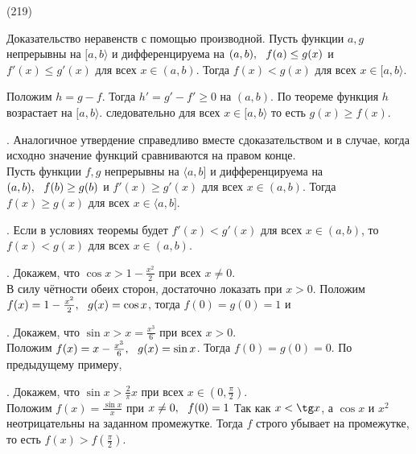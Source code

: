 (219)

\T \q Доказательство неравенств с помощью производной. Пусть функции $a, g$ непрерывны на $[a, b\rangle$ и дифференцируема на $(a, b),\ \  f(a) \le g(x)$ и $f'(x) \le g'(x)$ для всех $x \in (a, b)$. Тогда $f(x) < g(x)$ для всех $x \in [a, b\rangle$.

\D Положим $h = g - f$. Тогда $h' = g' - f' \ge 0$ на $(a, b)$. По теореме функция $h$ возрастает на $[a, b\rangle$. следовательно для всех $x \in [a, b\rangle$  то есть $g(x) \ge f(x)$.

. Аналогичное утвердение справедливо вместе сдоказательством и в случае, когда исходно значение функций сравниваются на правом конце.\\
Пусть функции $f, g$ непрерывны на $\langle a, b]$  и дифференцируема на $(a, b),\ \  f(b) \ge g(b)$ и $f'(x) \ge g'(x)$ для всех $x \in  (a, b)$. Тогда $f(x) \ge g(x)$ для всех $x \in \langle a, b]$.

. Если в условиях теоремы будет $f'(x) < g'(x)$ для всех $x \in (a, b)$, то $f(x) < g(x)$ для всех $x \in (a, b)$.

. Докажем, что $\cos x > 1 - \frac{x^2}2$ при всех $x\neq 0$.\\
В силу чётности обеих сторон, достаточно локазать при $x > 0$. Положим $f(x) = 1 - \frac{x^2}2,\ \  g(x) = \cos x$, тогда $f(0) = g(0) = 1$ и 

. Докажем, что $\sin x > x = \frac{x^3}6$ при всех $x > 0$.\\
Положим $f(x) = x - \frac{x^3}6,\ \  g(x) = \sin x$. Тогда $f(0) = g(0) = 0$. По предыдущему примеру, 

. Докажем, что $\sin x > \frac 2\pi x$ при всех $x \in (0, \frac\pi2)$.\\
Положим $f(x) = \frac{\sin x}{x}$ при $x \neq 0,\ \  f(0) = 1$  Так как $x < \tg x$, а $\cos x$ и $x^2$ неотрицательны на заданном промежутке. Тогда $f$ строго убывает на промежутке, то есть $f(x) > f(\frac\pi2)$.